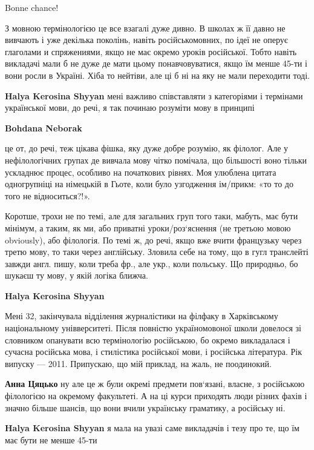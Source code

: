 \begin{itemize}
Bonne chance!


З мовною термінологією це все взагалі дуже дивно. В школах ж її давно не
вивчають і уже декілька поколінь, навіть російськомовних, по ідеї не оперує
глаголами и спряжениями, якщо не має окремо уроків російської. Тобто навіть
викладачі мали б не дуже де мати цьому понавчовуватися, якщо їм менше 45-ти і
вони росли в Україні. Хіба то нейтіви, але ці б ні на яку не мали переходити
тоді.

\begin{itemize} %
\textbf{Halya Kerosina Shyyan} мені важливо співставляти з категоріями і термінами української мови, до речі, я так починаю розуміти мову в принципі

\textbf{Bohdana Neborak} 

це от, до речі, теж цікава фішка, яку дуже добре розумію, як філолог. Але у
нефілологічних групах де вивчала мову чітко помічала, що більшості воно тільки
ускладнює процес, особливо на початкових рівнях. Моя улюблена цитата
одногрупніці на німецькій в Гьоте, коли було узгодження ім/прикм: «то то до
того не відноситься?!».

Коротше, трохи не по темі, але для загальних груп того таки, мабуть, має бути
мінімум, а таким, як ми, або приватні уроки/роз‘яснення (не третьою мовою
obviously), або філологія. По темі ж, до речі, якщо вже вчити французьку через
третю мову, то таки через англійську. Зловила себе на тому, що в гугл
транслейті завжди англ. пишу, коли треба фр., але укр., коли польську. Що
природньо, бо шукаєш ту мову, у якій логіка ближча.

\textbf{Halya Kerosina Shyyan} 

Мені 32, закінчувала відділення журналістики на філфаку в Харківському
національному унівверситеті. Після повністю україномовоної школи довелося зі
словником опанувати всю термінологію російською, бо окремо викладалася і
сучасна російська мова, і стилістика російської мови, і російська література.
Рік випуску — 2011. Припускаю, що мій приклад, на жаль, не поодинокий.

\textbf{Анна Цяцько} ну але це ж були окремі предмети пов‘язані, власне, з російською філологією на окремому факультеті. А на ці курси приходять люди різних фахів і значно більше шансів, що вони вчили українську граматику, а російську ні.

\textbf{Halya Kerosina Shyyan} я мала на увазі саме викладачів і тезу про те, що їм має бути не менше 45-ти


\end{itemize}
\end{itemize}
